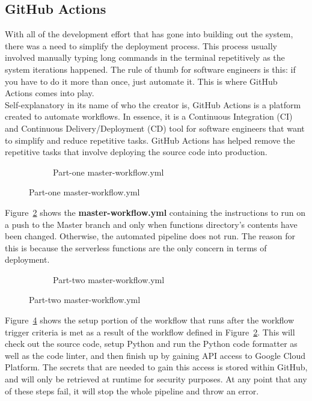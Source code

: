 \documentclass{article}
\begin{document}
\subsection{GitHub Actions}
With all of the development effort that has gone into building out the system, there was a need to simplify the deployment process. This process usually involved manually typing long commands in the terminal repetitively as the system iterations happened. The rule of thumb for software engineers is this: if you have to do it more than once, just automate it. This is where GitHub Actions comes into play.\\

Self-explanatory in its name of who the creator is, GitHub Actions is a platform created to automate workflows. In essence, it is a Continuous Integration (CI) and Continuous Delivery/Deployment (CD) tool for software engineers that want to simplify and reduce repetitive tasks. GitHub Actions has helped remove the repetitive tasks that involve deploying the source code into production.

\begin{figure}[H]
	\begin{figure}[H]
		
		\caption{Part-one master-workflow.yml}
		\label{fig:workflow-file-one}
	\end{figure}
\end{figure}

Figure~\ref{fig:workflow-file-one} shows the \textbf{master-workflow.yml} containing the instructions to run on a push to the Master branch and only when functions directory's contents have been changed. Otherwise, the automated pipeline does not run. The reason for this is because the serverless functions are the only concern in terms of deployment.

\begin{figure}[H]
	\begin{figure}[H]
		
		\caption{Part-two master-workflow.yml}
		\label{fig:workflow-file-two}
	\end{figure}
\end{figure}

Figure~\ref{fig:workflow-file-two} shows the setup portion of the workflow that runs after the workflow trigger criteria is met as a result of the workflow defined in Figure~\ref{fig:workflow-file-one}. This will check out the source code, setup Python and run the Python code formatter as well as the code linter, and then finish up by gaining API access to Google Cloud Platform. The secrets that are needed to gain this access is stored within GitHub, and will only be retrieved at runtime for security purposes. At any point that any of these steps fail, it will stop the whole pipeline and throw an error.\\
\end{document}
